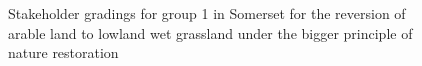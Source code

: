 \documentclass[
  12pt,
  letterpaper,
  DIV=11,
  numbers=noendperiod]{scrartcl}
\begin{document}
\begin{figure}[H]


\caption{\label{fig-SomArBigG1}Stakeholder gradings for group 1 in
Somerset for the reversion of arable land to lowland wet grassland under
the bigger principle of nature restoration}

\end{figure}%
\end{document}
